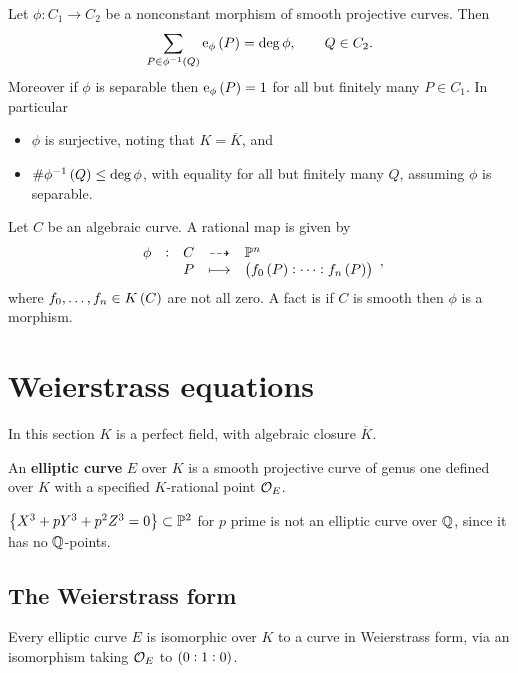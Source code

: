\begin{theorem}
\label{thm:2.8}
Let $ \phi : C_1 \to C_2 $ be a nonconstant morphism of smooth projective curves. Then
$$ \sum_{P \in \phi^{-1}\br{Q}} \e_\phi\br{P} = \deg \phi, \qquad Q \in C_2. $$
Moreover if $ \phi $ is separable then $ \e_\phi\br{P} = 1 $ for all but finitely many $ P \in C_1 $. In particular
\begin{itemize}
\item $ \phi $ is surjective, noting that $ K = \overline{K} $, and
\item $ \#\phi^{-1}\br{Q} \le \deg \phi $, with equality for all but finitely many $ Q $, assuming $ \phi $ is separable.
\end{itemize}
\end{theorem}

\begin{remark}
\label{rem:2.9}
Let $ C $ be an algebraic curve. A rational map is given by
$$ \rational[\phi]{C}{\PP^n}{P}{\br{f_0\br{P} : \dots : f_n\br{P}}}, $$
where $ f_0, \dots, f_n \in K\br{C} $ are not all zero. A fact is if $ C $ is smooth then $ \phi $ is a morphism.
\end{remark}

\pagebreak

\section{Weierstrass equations}

In this section $ K $ is a perfect field, with algebraic closure $ \overline{K} $.

\begin{definition*}
An \textbf{elliptic curve} $ E $ over $ K $ is a smooth projective curve of genus one defined over $ K $ with a specified $ K $-rational point $ \mathcal{O}_E $.
\end{definition*}

\begin{example*}
$ \cbr{X^3 + pY^3 + p^2Z^3 = 0} \subset \PP^2 $ for $ p $ prime is not an elliptic curve over $ \mathbb{Q} $, since it has no $ \mathbb{Q} $-points.
\end{example*}

\subsection{The Weierstrass form}

\begin{theorem}
\label{thm:3.1}
Every elliptic curve $ E $ is isomorphic over $ K $ to a curve in Weierstrass form, via an isomorphism taking $ \mathcal{O}_E $ to $ \br{0 : 1 : 0} $.
\end{theorem}

